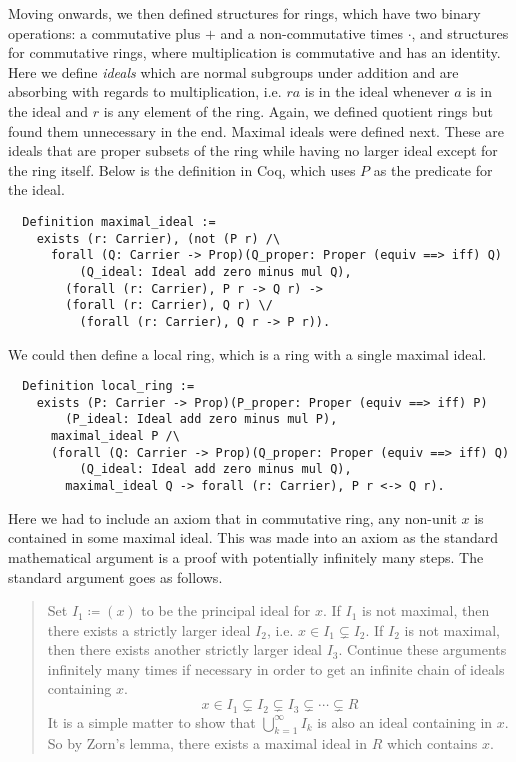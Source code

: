 \documentclass{article}
\begin{document}
Moving onwards, we then defined structures for rings, which have two binary
operations: a commutative plus \(+\) and a non-commutative times \(\cdot\), and
structures for commutative rings, where multiplication is commutative and has
an identity. Here we define \emph{ideals} which are normal subgroups under
addition and are absorbing with regards to multiplication, i.e. \(r a\) is in
the ideal whenever \(a\) is in the ideal and \(r\) is any element of the ring.
Again, we defined quotient rings but found them unnecessary in the end. Maximal
ideals were defined next. These are ideals that are proper subsets of the ring
while having no larger ideal except for the ring itself. Below is the
definition in Coq, which uses \(P\) as the predicate for the ideal.
\begin{verbatim}
  Definition maximal_ideal :=
    exists (r: Carrier), (not (P r) /\
      forall (Q: Carrier -> Prop)(Q_proper: Proper (equiv ==> iff) Q)
          (Q_ideal: Ideal add zero minus mul Q),
        (forall (r: Carrier), P r -> Q r) ->
        (forall (r: Carrier), Q r) \/
          (forall (r: Carrier), Q r -> P r)).
\end{verbatim}
We could then define a local ring, which is a ring with a single maximal ideal.
\begin{verbatim}
  Definition local_ring :=
    exists (P: Carrier -> Prop)(P_proper: Proper (equiv ==> iff) P)
        (P_ideal: Ideal add zero minus mul P),
      maximal_ideal P /\
      (forall (Q: Carrier -> Prop)(Q_proper: Proper (equiv ==> iff) Q)
          (Q_ideal: Ideal add zero minus mul Q),
        maximal_ideal Q -> forall (r: Carrier), P r <-> Q r).
\end{verbatim}

Here we had to include an axiom that in commutative ring, any non-unit \(x\) is
contained in some maximal ideal. This was made into an axiom as the standard
mathematical argument is a proof with potentially infinitely many steps. The
standard argument goes as follows.
\begin{quote}
    Set \(I_{1}\coloneqq (x)\) to be the principal ideal for \(x\). If
    \(I_{1}\) is not maximal, then there exists a strictly larger ideal
    \(I_{2}\), i.e. \(x\in I_{1}\subsetneq I_{2}\). If \(I_{2}\) is not
    maximal, then there exists another strictly larger ideal \(I_{3}\).
    Continue these arguments infinitely many times if necessary in order to get
    an infinite chain of ideals containing \(x\).
    \[x\in I_{1}\subsetneq I_{2}\subsetneq I_{3}\subsetneq\cdots\subsetneq R\]
    It is a simple matter to show that \(\bigcup_{k=1}^{\infty} I_{k}\) is also
    an ideal containing in \(x\). So by Zorn's lemma, there exists a maximal
    ideal in \(R\) which contains \(x\).
\end{quote}
\end{document}
